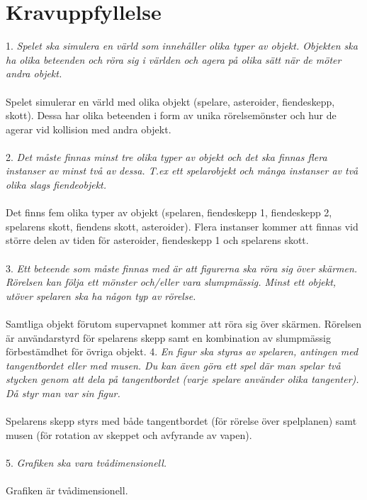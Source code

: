\documentclass{TDP003mall}
\begin{document}
\section{Kravuppfyllelse}
1. \emph{Spelet ska simulera en värld som innehåller olika typer av objekt. Objekten ska ha olika beteenden och röra sig i världen och agera på olika sätt när de möter andra objekt.} \\
\\
Spelet simulerar en värld med olika objekt (spelare, asteroider, fiendeskepp, skott). Dessa har olika beteenden
i form av unika rörelsemönster och hur de agerar vid kollision med andra objekt. \\
\\
2. \emph{Det måste finnas minst tre olika typer av objekt och det ska finnas flera instanser av minst två av dessa. T.ex ett spelarobjekt och många instanser av två olika slags fiendeobjekt.} \\
\\
Det finns fem olika typer av objekt (spelaren, fiendeskepp 1, fiendeskepp 2, spelarens skott, fiendens skott, 
asteroider). Flera instanser kommer att finnas vid större delen av tiden för asteroider, fiendeskepp 1 och 
spelarens skott. \\
\\
3. \emph{Ett beteende som måste finnas med är att figurerna ska röra sig över skärmen. Rörelsen kan följa ett mönster och/eller vara slumpmässig. Minst ett objekt, utöver spelaren ska ha någon typ av rörelse.}\\
\\
Samtliga objekt förutom supervapnet kommer att röra sig över skärmen. Rörelsen är användarstyrd för spelarens
skepp samt en kombination av slumpmässig förbestämdhet för övriga objekt.
4. \emph{En figur ska styras av spelaren, antingen med tangentbordet eller med musen. Du kan även göra ett spel där man spelar två stycken genom att dela på tangentbordet (varje spelare använder olika tangenter). Då styr man var sin figur.} \\
\\
Spelarens skepp styrs med både tangentbordet (för rörelse över spelplanen) samt musen (för rotation av skeppet
och avfyrande av vapen).\\
\\
5. \emph{Grafiken ska vara tvådimensionell.} \\
\\
Grafiken är tvådimensionell. \\
\\
\end{document}
